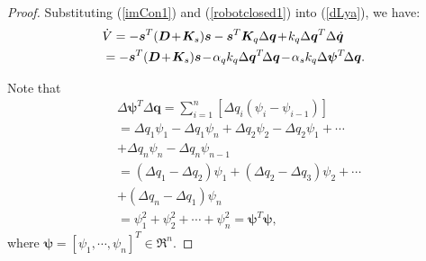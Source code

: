 \documentclass[letterpaper, 10 pt, conference]{ieeeconf}
\begin{document}
\begin{proof}
Substituting (\ref{imCon1}) and (\ref{robotclosed1}) into
(\ref{dLya}), we have:
\begin{eqnarray}
&\dot V%
=-\bm s^T(\bm D\hspace{-0.05cm}+\hspace{-0.05cm}\bm K_s)\bm
s-\bm s^T\bm K_q\Delta\bm q\hspace{-0.05cm}+\hspace{-0.05cm}k_q\Delta\bm q^T\Delta\dot{\bm q}\nonumber\\
&=-\bm s^T(\bm D\hspace{-0.05cm}+\hspace{-0.05cm}\bm K_s)\bm
s\hspace{-0.05cm}-\hspace{-0.05cm}\alpha_q k_q\Delta\bm q^T\hspace{-0.05cm}\Delta\bm q\hspace{-0.05cm}-\hspace{-0.05cm}\alpha_s k_q\Delta\bm \psi^T\hspace{-0.05cm}\Delta\bm q.\label{dLya1}
\end{eqnarray}

Note that
\begin{eqnarray}
&\Delta\bm \psi^T\Delta\bm q=\sum\limits_{i=1}^n[\Delta q_i(\psi_i-\psi_{i-1})]\nonumber\\
&=\Delta q_1\psi_1-\Delta q_1\psi_n+\Delta q_2\psi_2-\Delta q_2\psi_1+\cdots\nonumber\\
&+\Delta q_n\psi_n-\Delta q_n\psi_{n-1}\nonumber\\
&=(\Delta q_1-\Delta q_2)\psi_1+(\Delta q_2-\Delta q_3)\psi_2+\cdots\nonumber\\
&+(\Delta q_n-\Delta q_1)\psi_n\nonumber\\
&=\psi_1^2+\psi_2^2+\cdots+\psi_n^2=\bm\psi^T\bm\psi,\label{psi}
\end{eqnarray}
where $\bm\psi=[\psi_1, \cdots, \psi_n]^T\in\Re^n$.


\end{proof}
\end{document}
